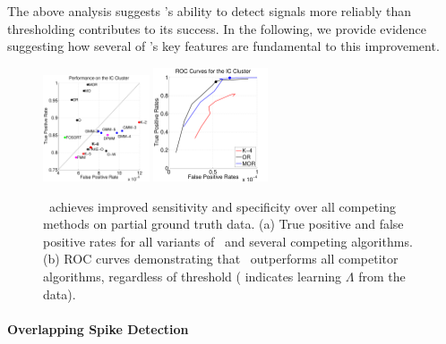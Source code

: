 The above analysis suggests \smug's ability to detect signals more reliably than thresholding contributes to its success.  In the following, we provide evidence suggesting how several of \smug's key features are fundamental to this improvement.
%
\begin{center}
\begin{figure}
	\includegraphics[width=0.28\textwidth]{../figs/truefalsepositive.pdf}
	\includegraphics[width=0.3\textwidth]{../figs/new/icroc.pdf}
\caption{\smug\ achieves improved sensitivity and specificity over all competing methods on partial ground truth data. %
(a) True positive and false positive rates for all variants of \smug\ and several competing 
algorithms.  
(b) ROC curves demonstrating that \smug\ outperforms all competitor algorithms, regardless of threshold (\jovo{$\bullet$} indicates learning $\Lambda$ from the data).\label{hc1res}}
\end{figure}
\end{center}
% 
% 
% 
\vspace{-10pt}
\vspace{-.1in}
\paragraph{Overlapping Spike Detection}



